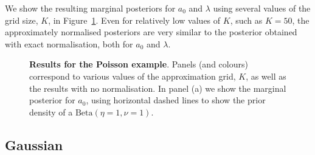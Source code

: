 \documentclass[a4paper, notitlepage, 11pt]{article}
\begin{document}
We show the resulting marginal posteriors for $a_0$ and $\lambda$ using several values of the grid size, $K$, in Figure~\ref{fig:poisson}.
Even for relatively low values of $K$, such as $K = 50$, the approximately normalised posteriors are very similar to the posterior obtained with exact normalisation, both for $a_0$ and $\lambda$.

\begin{figure}[!ht]
\hfill
{}
\hfill
{}
\hfill
\caption{\textbf{Results for the Poisson example}.
Panels (and colours) correspond to various values of the approximation grid, $K$, as well as the results with no normalisation.
In panel (a) we show the marginal posterior for $a_0$, using horizontal dashed lines to show the prior density of a $\text{Beta}(\eta = 1, \nu = 1)$.
}
\label{fig:poisson}
\end{figure}

\subsection{Gaussian}
\label{sec:gaussian_illus}
\end{document}
